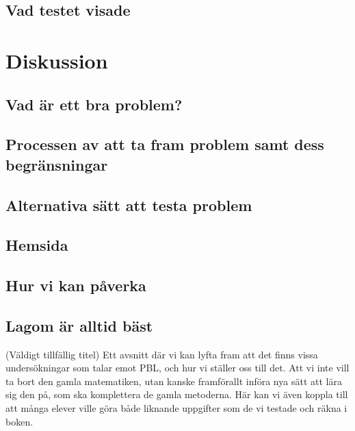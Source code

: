 \documentclass[11pt,a4paper]{article}
\begin{document}
    \subsection{Vad testet visade}
    \label{sec:slutenkat}
    

\section{Diskussion}%
    
    
    \subsection{Vad är ett bra problem?}
        

    \subsection{Processen av att ta fram problem samt dess begränsningar}
        
        
    \subsection{Alternativa sätt att testa problem}
        
        
    \subsection{Hemsida}
        
        
    \subsection{Hur vi kan påverka}
        

    \subsection{Lagom är alltid bäst}
        (Väldigt tillfällig titel)
        Ett avsnitt där vi kan lyfta fram att det finns vissa undersökningar som talar emot PBL, och hur vi ställer oss till det. Att vi inte vill ta bort den gamla matematiken, utan kanske framförallt införa nya sätt att lära sig den på, som ska komplettera de gamla metoderna. Här kan vi även koppla till att många elever ville göra både liknande uppgifter som de vi testade och räkna i boken.
\end{document}

